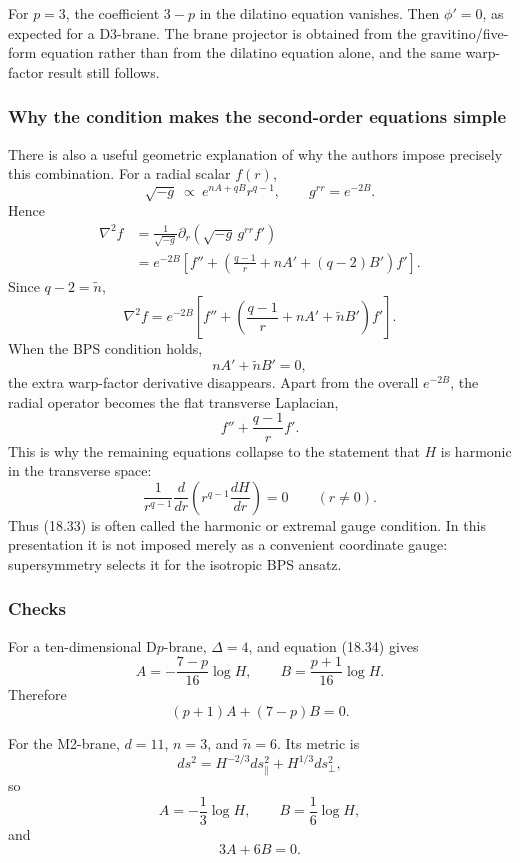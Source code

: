 \documentclass[
  10pt,
  a4paper,
  openany]{book}
\begin{document}
For \(p=3\), the coefficient \(3-p\) in the dilatino equation vanishes.
Then \(\phi'=0\), as expected for a D3-brane. The brane projector is
obtained from the gravitino/five-form equation rather than from the
dilatino equation alone, and the same warp-factor result still follows.

\subsubsection{Why the condition makes the second-order equations
simple}\label{why-the-condition-makes-the-second-order-equations-simple}

There is also a useful geometric explanation of why the authors impose
precisely this combination. For a radial scalar \(f(r)\), \[
\sqrt{-g}
\ \propto\
e^{nA+qB}r^{q-1},
\qquad
g^{rr}=e^{-2B}.
\] Hence \[
\begin{aligned}
\nabla^2 f
&=\frac1{\sqrt{-g}}
\partial_r\left(\sqrt{-g}\,g^{rr}f'\right)\\
&=e^{-2B}
\left[
f''
+\left(
\frac{q-1}{r}
+nA'
+(q-2)B'
\right)f'
\right].
\end{aligned}
\] Since \(q-2=\tilde n\), \[
\nabla^2 f
=e^{-2B}
\left[
f''
+\left(
\frac{q-1}{r}
+nA'
+\tilde nB'
\right)f'
\right].
\] When the BPS condition holds, \[
nA'+\tilde nB'=0,
\] the extra warp-factor derivative disappears. Apart from the overall
\(e^{-2B}\), the radial operator becomes the flat transverse Laplacian,
\[
f''+\frac{q-1}{r}f'.
\] This is why the remaining equations collapse to the statement that
\(H\) is harmonic in the transverse space: \[
\frac1{r^{q-1}}
\frac{d}{dr}\left(r^{q-1}\frac{dH}{dr}\right)=0
\qquad
(r\neq0).
\] Thus (18.33) is often called the harmonic or extremal gauge
condition. In this presentation it is not imposed merely as a convenient
coordinate gauge: supersymmetry selects it for the isotropic BPS ansatz.

\subsubsection{Checks}\label{checks-31}

For a ten-dimensional D\(p\)-brane, \(\Delta=4\), and equation (18.34)
gives \[
A=-\frac{7-p}{16}\log H,
\qquad
B=\frac{p+1}{16}\log H.
\] Therefore \[
(p+1)A+(7-p)B=0.
\]

For the M2-brane, \(d=11\), \(n=3\), and \(\tilde n=6\). Its metric is
\[
ds^2=H^{-2/3}ds_\parallel^2+H^{1/3}ds_\perp^2,
\] so \[
A=-\frac13\log H,
\qquad
B=\frac16\log H,
\] and \[
3A+6B=0.
\]
\end{document}
